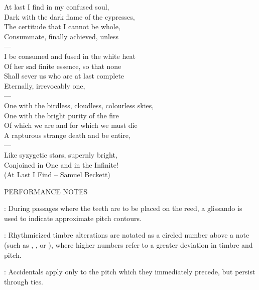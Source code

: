 \documentclass[11pt]{article}
\newcommand*\circled[1]{\tikz[baseline=(char.base)]{
            \node[shape=circle,draw,inner sep=1pt] (char) {#1};}}
\begin{document}
\begingroup
\begin{center}
At last I find in my confused soul, \\
Dark with the dark flame of the cypresses, \\
The certitude that I cannot be whole, \\
Consummate, finally achieved, unless \\
 ---\\
I be consumed and fused in the white heat \\
Of her sad finite essence, so that none \\
Shall sever us who are at last complete \\
Eternally, irrevocably one, \\
 ---\\
One with the birdless, cloudless, colourless skies, \\
One with the bright purity of the fire \\
Of which we are and for which we must die \\
A rapturous strange death and be entire, \\
 ---\\
Like syzygetic stars, supernly bright, \\
Conjoined in One and in the Infinite! \\
\rightskip\leftskip
\phantom{text} \hfill (At Last I Find -- Samuel Beckett)
\end{center}
\endgroup

\vspace*{2\baselineskip}

\begin{center}
\huge PERFORMANCE NOTES
\end{center}
\begingroup
\begin{center}

 : During passages where the teeth are to be placed on the reed, a glissando is used to indicate approximate pitch contours.
\rightskip\leftskip
\phantom{text} \hfill \phantom{()}


 : Rhythmicized timbre alterations are notated as a circled number above a note (such as \circled{1}, \circled{2}, or \circled{3}), where higher numbers refer to a greater deviation in timbre and pitch.
\rightskip\leftskip
\phantom{text} \hfill \phantom{()}

 : Accidentals apply only to the pitch which they immediately precede, but persist through ties.
\rightskip\leftskip
\phantom{text} \hfill \phantom{()}
\end{center}
\endgroup
\end{document}
